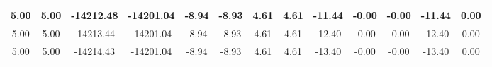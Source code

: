 \begin{table}[htbp]
\begin{adjustbox}{angle=90}
\begin{tabular}{|c|c|c|c|c|c|c|c|c|c|c|c|c|}
 5.00 & 5.00 & -14212.48 & -14201.04 & -8.94 & -8.93 & 4.61 & 4.61 & -11.44 & -0.00 & -0.00 & -11.44 & 0.00\\ \hline
 5.00 & 5.00 & -14213.44 & -14201.04 & -8.94 & -8.93 & 4.61 & 4.61 & -12.40 & -0.00 & -0.00 & -12.40 & 0.00\\ \hline
 5.00 & 5.00 & -14214.43 & -14201.04 & -8.94 & -8.93 & 4.61 & 4.61 & -13.40 & -0.00 & -0.00 & -13.40 & 0.00\\ \hline
            \end{tabular}
        \end{adjustbox}
        \caption{}
        \label{}
    \end{table}
    